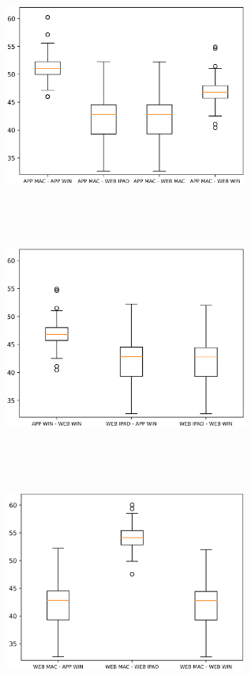 \begingroup
    \centering
    \includegraphics[width=8cm, height=8cm, keepaspectratio]{Immagini/PSNR/Immagine1.png}\hspace{1em}
    \includegraphics[width=8cm, height=8cm, keepaspectratio]{Immagini/PSNR/Immagine2.png}\\\vspace{1em}
    \includegraphics[width=8cm, height=8cm, keepaspectratio]{Immagini/PSNR/Immagine3.png}
    \label{fig:psnr_results}
\endgroup

